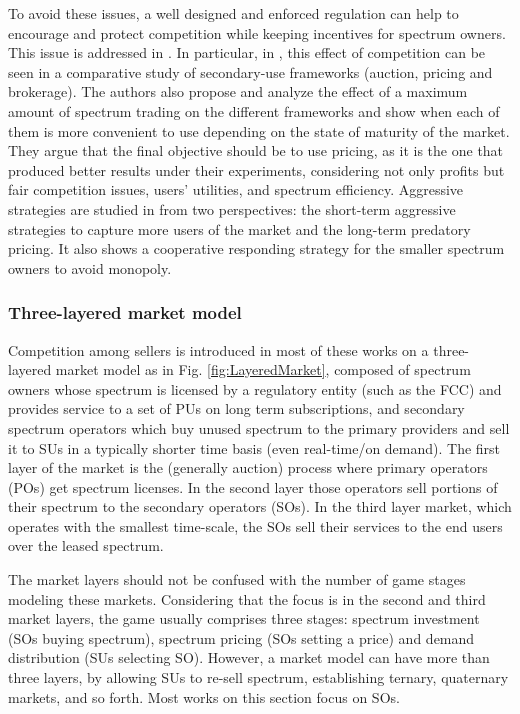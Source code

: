 To avoid these issues, a well designed and enforced regulation can help to encourage and protect competition while keeping incentives for spectrum owners. This issue is addressed in \cite{ref:Yoon2012,ref:Tan2010}. In particular, in \cite{ref:Yoon2012}, this effect of competition can be seen in a comparative study of secondary-use frameworks (auction, pricing and brokerage). The authors also propose and analyze the effect of a maximum amount of spectrum trading on the different frameworks and show when each of them is more convenient to use depending on the state of maturity of the market. They argue that the final objective should be to use pricing, as it is the one that produced better results under their experiments, considering not only profits but fair competition issues, users' utilities, and spectrum efficiency. Aggressive strategies are studied in  \cite{ref:Tan2010} from two perspectives: the short-term aggressive strategies to capture more users of the market and the long-term predatory pricing. It also shows a cooperative responding strategy for the smaller spectrum owners to avoid monopoly. 

\subsubsection{Three-layered market model}
Competition among sellers is introduced in most of these works on a three-layered market model as in Fig. \ref{fig:LayeredMarket}, composed of spectrum owners whose spectrum is licensed by a regulatory entity (such as the FCC) and provides service to a set of PUs on long term subscriptions, and secondary spectrum operators which buy unused spectrum to the primary providers and sell it to SUs in a typically shorter time basis (even real-time/on demand). The first layer of the market is the (generally auction) process where primary operators (POs) get spectrum licenses. 
In the second layer those operators sell portions of their spectrum to the secondary operators (SOs).
In the third layer market, which operates with the smallest time-scale, the SOs sell their services to the end users over the leased spectrum. 

The market layers should not be confused with the number of game stages modeling these markets. Considering that the focus is in the second and third market layers, the game usually comprises three stages: spectrum investment (SOs buying spectrum), spectrum pricing (SOs setting a price) and demand distribution (SUs selecting SO). However, a market model can have more than three layers, by allowing SUs to re-sell spectrum, establishing ternary, quaternary markets, and so forth. Most works on this section focus on SOs.

